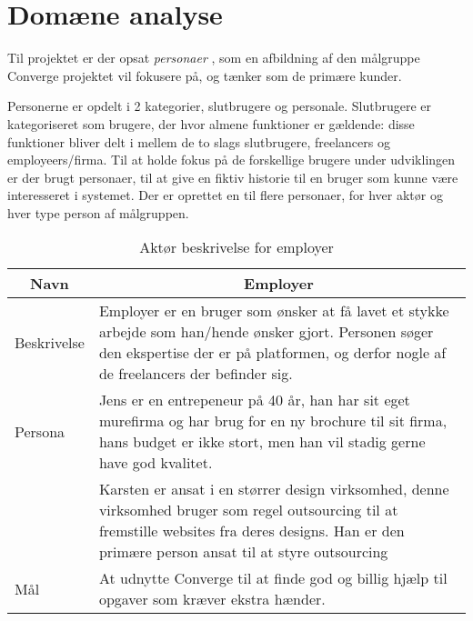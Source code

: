 \section{Domæne analyse}

Til projektet er der opsat \emph{personaer} \cite[Personaer]{converge-terms}, som en afbildning af den målgruppe Converge projektet vil fokusere på, og tænker som de primære kunder.

Personerne er opdelt i 2 kategorier, slutbrugere og personale. Slutbrugere er kategoriseret som brugere, der hvor almene funktioner er gældende: disse funktioner bliver delt i mellem de to slags slutbrugere, freelancers og employeers/firma. Til at holde fokus på de forskellige brugere under udviklingen er der brugt personaer, til at give en fiktiv historie til en bruger som kunne være interesseret i systemet. Der er oprettet en til flere personaer, for hver aktør \cite[Aktør]{converge-terms} og hver type person af målgruppen.

\begin{table}[H]
    \begin{small}
        \caption{Aktør beskrivelse for employer}
        \label{tab:employer}
        \begin{center}
            \begin{tabular}[c]{p{3cm}|p{8cm}}
                \multicolumn{1}{c|}{\textbf{Navn}} & \multicolumn{1}{c}{\textbf{Employer}}                                                                                                                                                                                           \\
                \hline
                Beskrivelse                        & \multicolumn{1}{p{10cm}}{Employer er en bruger som ønsker at få lavet et stykke arbejde som han/hende ønsker gjort. Personen søger den ekspertise der er på platformen, og derfor nogle af de freelancers der befinder sig.}    \\
                \hline
                Persona                            & \multicolumn{1}{p{10cm}}{Jens er en entrepeneur på 40 år, han har sit eget murefirma og har brug for en ny brochure til sit firma, hans budget er ikke stort, men han vil stadig gerne have god kvalitet.}                      \\
                                                   & \multicolumn{1}{p{10cm}}{Karsten er ansat i en størrer design virksomhed, denne virksomhed bruger som regel outsourcing til at fremstille websites fra deres designs. Han er den primære person ansat til at styre outsourcing} \\
                \hline
                Mål                                & \multicolumn{1}{p{10cm}}{At udnytte Converge til at finde god og billig hjælp til opgaver som kræver ekstra hænder.}                                                                                                            \\
            \end{tabular}
        \end{center}
    \end{small}
\end{table}

